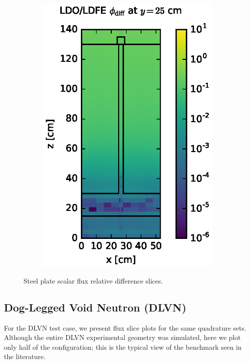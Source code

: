 \documentclass{article} %
\begin{document}
\begin{figure}[!htb]
\begin{subfigure}{0.4\textwidth}
\includegraphics[max height=0.445\textheight]
{img/steel-flux-diff-ldfe.eps}
\end{subfigure}
\caption{Steel plate scalar flux relative difference slices.}
\label{steel-fwd-diff-rel}
\end{figure}

\FloatBarrier
\subsection{Dog-Legged Void Neutron (DLVN)}

For the DLVN test case, we present flux slice plots for the same 
quadrature sets. Although the entire DLVN
experimental geometry was simulated, here we plot only half of the
configuration; this is the typical view of the benchmark seen in the
literature.
\end{document}
